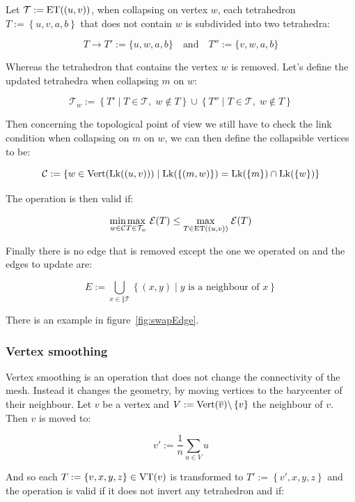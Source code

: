 \documentclass[11pt]{article}
\begin{document}
Let $\mathcal{T} := \mathrm{ET}((u,v))$, when collapsing on vertex $w$, each tetrahedron $T := \left\{u,v,a,b\right\}$ that does not contain $w$ is subdivided into two tetrahedra:

$$T \rightarrow T' := \{u, w ,a,b\} \quad \text{and} \quad T'' :=\{v, w ,a,b\}$$

Whereas the tetrahedron that contains the vertex $w$ is removed. Let's define the updated tetrahedra when
collapsing $m$ on $w$:

$$\mathcal{T}_{w} :=
	\left\{T'\;|\;T\in\mathcal{T},\; w\notin T\right\} \cup\left\{T''\;|\;T\in\mathcal{T},\; w\notin
	T\right\}$$

Then concerning the topological point of view we still have to check the link condition when collapsing on $m$
on $w$, we can then define the collapsible vertices to be:

$$\mathcal{C} := \left\{w\in\mathrm{Vert}(\mathrm{Lk}((u,v)))\;|\; \mathrm{Lk}(\left\{(m,w)\right\}) = \mathrm{Lk}(\left\{m\right\}) \cap
	\mathrm{Lk}(\left\{w\right\})\right\}$$


The operation is then valid if:

$$\underset{w\in\mathcal{C}}{\min}\underset{T\in\mathcal{T}_{w}}{\max}\;\mathcal{E}(T)\leq\underset{T\in\mathrm{ET}((u,v))}{\max}\;\mathcal{E}(T)$$

Finally there is no edge that is removed except the one we operated on and the edges to update are:

$$E:= \underset{x\in\Vert{\mathcal{T}}}{\bigcup}\left\{(x,y)\;|\; y\text{ is a neighbour of }x\right\}$$

There is an example in figure~\ref{fig:swapEdge}.

\subsubsection{Vertex smoothing}



Vertex smoothing is an operation that does not change the connectivity of the mesh. Instead it changes the
geometry, by moving vertices to the barycenter of their neighbour. Let $v$ be a vertex and
$V:=\mathrm{Vert}(\overline{v})\backslash\left\{v\right\}$ the neighbour of $v$. Then $v$ is moved to:

$$v' := \frac{1}{n}\sum_{u\in V} u$$

And so each $T := \left\{v,x,y,z\right\}\in\mathrm{VT}(v)$ is transformed to $T' := \left\{v',x,y,z\right\}$ and the
operation is valid if it does not invert any tetrahedron and if:
\end{document}
